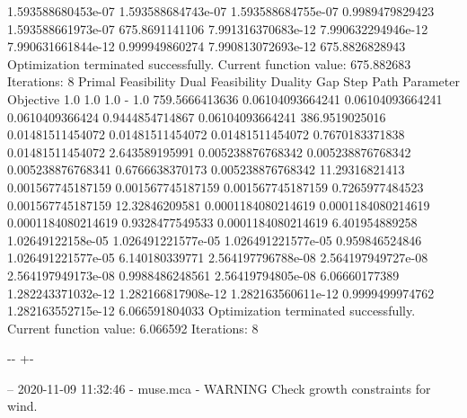 \documentclass[letterpaper,10pt,english]{sphinxmanual}
\newlength\nbsphinxcodecellspacing
\begin{document}
{\begin{sphinxVerbatim}[commandchars=\\\{\}]
1.593588680453e-07  1.593588684743e-07  1.593588684755e-07  0.9989479829423  1.593588661973e-07  675.8691141106
7.991316370683e-12  7.990632294946e-12  7.990631661844e-12  0.999949860274   7.990813072693e-12  675.8826828943
Optimization terminated successfully.
         Current function value: 675.882683
         Iterations: 8
Primal Feasibility  Dual Feasibility    Duality Gap         Step             Path Parameter      Objective
1.0                 1.0                 1.0                 -                1.0                 759.5666413636
0.06104093664241    0.06104093664241    0.0610409366424     0.9444854714867  0.06104093664241    386.9519025016
0.01481511454072    0.01481511454072    0.01481511454072    0.7670183371838  0.01481511454072    2.643589195991
0.005238876768342   0.005238876768342   0.005238876768341   0.6766638370173  0.005238876768342   11.29316821413
0.001567745187159   0.001567745187159   0.001567745187159   0.7265977484523  0.001567745187159   12.32846209581
0.0001184080214619  0.0001184080214619  0.0001184080214619  0.9328477549533  0.0001184080214619  6.401954889258
1.02649122158e-05   1.026491221577e-05  1.026491221577e-05  0.959846524846   1.026491221577e-05  6.140180339771
2.564197796788e-08  2.564197949727e-08  2.564197949173e-08  0.9988486248561  2.56419794805e-08   6.06660177389
1.282243371032e-12  1.282166817908e-12  1.282163560611e-12  0.9999499974762  1.282163552715e-12  6.066591804033
Optimization terminated successfully.
         Current function value: 6.066592
         Iterations: 8
\end{sphinxVerbatim}
}

{

\kern-\sphinxverbatimsmallskipamount\kern-\baselineskip
\kern+\FrameHeightAdjust\kern-\fboxrule
\vspace{\nbsphinxcodecellspacing}

\begin{sphinxVerbatim}[commandchars=\\\{\}]
-- 2020-11-09 11:32:46 - muse.mca - WARNING
Check growth constraints for wind.

\end{sphinxVerbatim}
}
\end{document}

